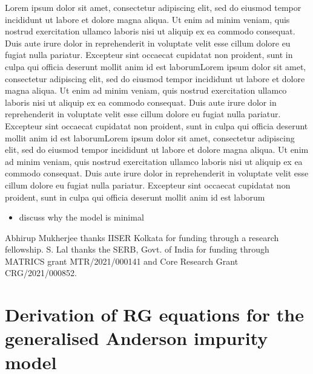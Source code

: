 \documentclass[reprint,superscriptaddress,floatfix]{revtex4-2}
\begin{document}
Lorem ipsum dolor sit amet, consectetur adipiscing elit, sed do eiusmod tempor incididunt ut labore et dolore magna aliqua. Ut enim ad minim veniam, quis nostrud exercitation ullamco laboris nisi ut aliquip ex ea commodo consequat. Duis aute irure dolor in reprehenderit in voluptate velit esse cillum dolore eu fugiat nulla pariatur. Excepteur sint occaecat cupidatat non proident, sunt in culpa qui officia deserunt mollit anim id est laborumLorem ipsum dolor sit amet, consectetur adipiscing elit, sed do eiusmod tempor incididunt ut labore et dolore magna aliqua. Ut enim ad minim veniam, quis nostrud exercitation ullamco laboris nisi ut aliquip ex ea commodo consequat. Duis aute irure dolor in reprehenderit in voluptate velit esse cillum dolore eu fugiat nulla pariatur. Excepteur sint occaecat cupidatat non proident, sunt in culpa qui officia deserunt mollit anim id est laborumLorem ipsum dolor sit amet, consectetur adipiscing elit, sed do eiusmod tempor incididunt ut labore et dolore magna aliqua. Ut enim ad minim veniam, quis nostrud exercitation ullamco laboris nisi ut aliquip ex ea commodo consequat. Duis aute irure dolor in reprehenderit in voluptate velit esse cillum dolore eu fugiat nulla pariatur. Excepteur sint occaecat cupidatat non proident, sunt in culpa qui officia deserunt mollit anim id est laborum

\begin{itemize}
	\item discuss why the model is minimal
\end{itemize}

\acknowledgments
Abhirup Mukherjee thanks IISER Kolkata for funding through a research fellowship. S. Lal thanks the SERB, Govt. of India for funding through MATRICS grant MTR/2021/000141 and Core Research Grant CRG/2021/000852.



\appendix*

\section{Derivation of RG equations for the generalised Anderson impurity model}
\end{document}
